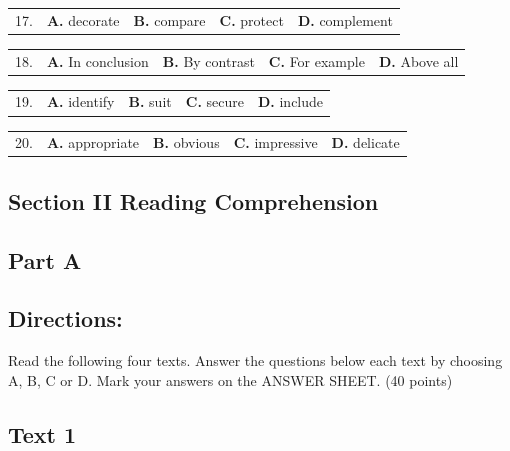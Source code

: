 \documentclass[UTF8,11pt]{ctexart}
\begin{document}
\noindent\begin{tabularx}{\linewidth}{@{}lXXXX@{}}17. & \textbf{A.} decorate & \textbf{B.} compare & \textbf{C.} protect & \textbf{D.} complement\\\end{tabularx}\par

\noindent\begin{tabularx}{\linewidth}{@{}lXXXX@{}}18. & \textbf{A.} In conclusion & \textbf{B.} By contrast & \textbf{C.} For example & \textbf{D.} Above all\\\end{tabularx}\par

\noindent\begin{tabularx}{\linewidth}{@{}lXXXX@{}}19. & \textbf{A.} identify & \textbf{B.} suit & \textbf{C.} secure & \textbf{D.} include\\\end{tabularx}\par

\noindent\begin{tabularx}{\linewidth}{@{}lXXXX@{}}20. & \textbf{A.} appropriate & \textbf{B.} obvious & \textbf{C.} impressive & \textbf{D.} delicate\\\end{tabularx}\par

\subsection*{\textbf{Section II Reading Comprehension}}


\subsection*{\textbf{Part A}}


\subsection*{\textbf{Directions:}}


Read the following four texts. Answer the questions below each text by choosing A, B, C or D. Mark your answers on the ANSWER SHEET. (40 points)


\subsection*{\textbf{Text 1}}
\end{document}
